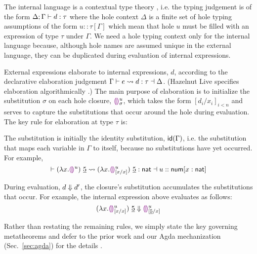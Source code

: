 The internal language is a contextual type theory \cite{Nanevski2008}, i.e. the typing judgement is
of the form $\hasTypeD{\Delta}{\Gamma}{d}{\tau}$ where the hole context $\Delta$ is a finite set of hole typing
assumptions of the form $u :: \tau[\Gamma]$ which mean that hole $u$ must be filled with an expression of type $\tau$ under $\Gamma$.
We need a hole typing context only for the internal language because, although hole names are assumed
unique in the external language, they can be duplicated during evaluation of internal expressions.

\newcommand{\tnat}{\mathsf{nat}}

External expressions elaborate to internal expressions, $d$,
according to the declarative elaboration judgement $\elabs{\Gamma}{e}{d}{\tau}{\Delta}$.
(Hazelnut Live specifies elaboration algorithmically \cite{HazelnutLive}.)
The main purpose of elaboration is to initialize the substitution $\sigma$ on each hole closure, $\dehole{u}{\sigma}$, 
which takes the form $[d_i/x_i]_{i<n}$ and serves to capture
the substitutions that occur around the hole during evaluation. The key rule for elaboration at type $\tau$ is:
\begin{mathpar}
\end{mathpar}
The substitution is initially the identity substitution, $\idof{\Gamma}$, i.e. the
substitution that maps each variable in $\Gamma$ to itself, because no substitutions have yet occurred. For example,
\[ \elabs{ }{(\hlam{x}{\hehole{u}})~\hnum{5}}{(\hlam{x}{\dehole{u}{[x/x]}})~{\hnum{5}}}{\tnat}{u :: \tnum[x : \tnat]} \]


During evaluation, $\evalsTo{d}{d'}$, the closure's substitution accumulates the substitutions that occur. For example,
the internal expression above evaluates as follows:
\[
  \evalsTo{(\hlam{x}{\dehole{u}{[x/x]}})~{\hnum{5}}}{
      \dehole{u}{[\hnum{5}/x]}
  }
\]


Rather than restating the remaining rules, we simply state the key governing
metatheorems and defer to the prior work and our Agda mechanization (Sec.~\ref{sec:agda}) for the details \cite{HazelnutLive}.


